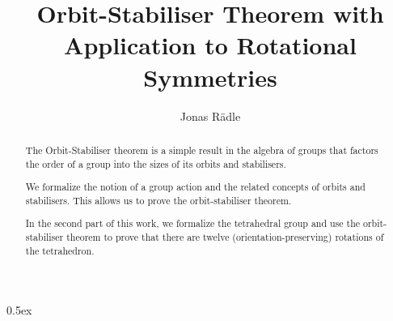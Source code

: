 \documentclass[11pt,a4paper]{article}
\begin{document}
\title{Orbit-Stabiliser Theorem with Application to Rotational Symmetries}
\author{Jonas Rädle}

\maketitle
\begin{abstract}
The Orbit-Stabiliser theorem is a simple result in the algebra of groups that factors
the order of a group into the sizes of its orbits and stabilisers. 

We formalize the notion of a group action and the related concepts of orbits and stabilisers.
This allows us to prove the orbit-stabiliser theorem.

In the second part of this work, we formalize the tetrahedral group and use the orbit-stabiliser 
theorem to prove that there are twelve (orientation-preserving) rotations of the tetrahedron.

\end{abstract}

\setcounter{tocdepth}{2}
\tableofcontents
\newpage

\parindent 0pt\parskip 0.5ex





\end{document}
